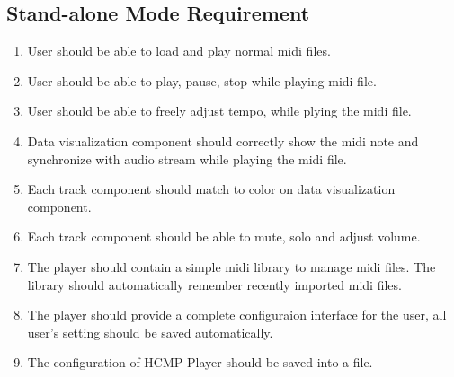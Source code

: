 \subsection{Stand-alone Mode Requirement}
\begin{enumerate}
  \item User should be able to load and play normal midi files.
  \item User should be able to play, pause, stop while playing midi file.  
  \item User should be able to freely adjust tempo, while plying the midi file.   
  \item Data visualization component should correctly show the midi note 
        and synchronize with audio stream while playing the midi file.
  \item Each track component should match to color on data visualization component.
  \item Each track component should be able to mute, solo and adjust volume.  
  \item The player should contain a simple midi library to manage midi files. 
        The library should automatically remember recently imported midi files.
  \item The player should provide a complete configuraion interface for the 
        user, all user's setting should be saved automatically.
  \item The configuration of HCMP Player should be saved into a file.
\end{enumerate}

